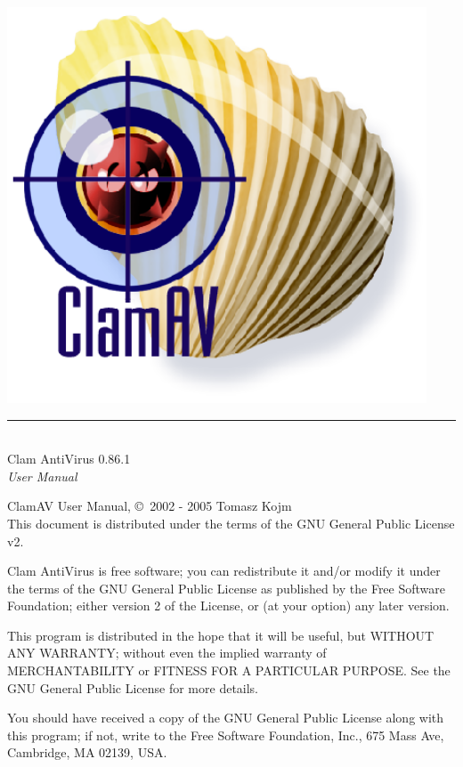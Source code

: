 \documentclass[a4paper,titlepage,12pt]{article}
\date{}
\begin{document}
    \setcounter{page}{0}

    \pagestyle{empty}
    \includegraphics[width=353pt]{clam.eps}
    \vspace{3cm}
    \begin{flushright}
	\rule[-1ex]{8cm}{3pt}\\
	\huge Clam AntiVirus 0.86.1\\
	\huge \emph{User Manual}\\
    \end{flushright}

    \newpage
    \pagestyle{fancy}
    \tableofcontents
    \vspace{11.5cm}

    \noindent
    \begin{boxedminipage}[b]{\textwidth}
    ClamAV User Manual, \copyright \  2002 - 2005 Tomasz Kojm\\
    This document is distributed under the terms of the GNU General
    Public License v2.
    \end{boxedminipage}

    \vspace{1.0cm}

    \noindent
    \begin{boxedminipage}[b]{\textwidth}
    Clam AntiVirus is free software; you can redistribute it and/or modify
    it under the terms of the GNU General Public License as published by
    the Free Software Foundation; either version 2 of the License, or
    (at your option) any later version.

    This program is distributed in the hope that it will be useful,
    but WITHOUT ANY WARRANTY; without even the implied warranty of
    MERCHANTABILITY or FITNESS FOR A PARTICULAR PURPOSE.  See the
    GNU General Public License for more details.

    You should have received a copy of the GNU General Public License
    along with this program; if not, write to the Free Software
    Foundation, Inc., 675 Mass Ave, Cambridge, MA 02139, USA.
    \end{boxedminipage}
\end{document}
